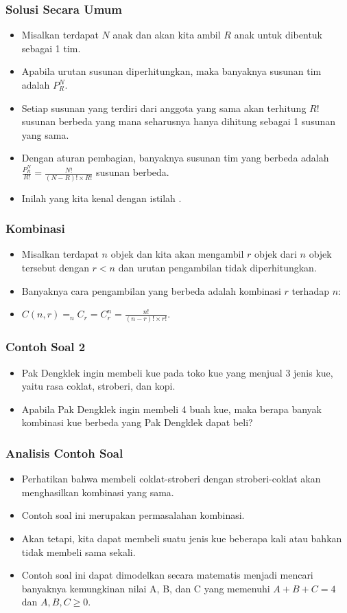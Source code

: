 \begin{frame}
\frametitle{Solusi Secara Umum}
\begin{itemize}
  \item Misalkan terdapat $N$ anak dan akan kita ambil $R$ anak untuk dibentuk sebagai 1 tim.
  \item Apabila urutan susunan diperhitungkan, maka banyaknya susunan tim adalah $P^{N}_{R}$.
  \item Setiap susunan yang terdiri dari anggota yang sama akan terhitung $R!$ susunan berbeda yang mana seharusnya hanya dihitung sebagai 1 susunan yang sama.
  \item Dengan aturan pembagian, banyaknya susunan tim yang berbeda adalah $\frac{P^{N}_{R}}{R!} = \frac{N!}{(N-R)! \times R!}$ susunan berbeda.
  \item Inilah yang kita kenal dengan istilah .
\end{itemize}
\end{frame}

\begin{frame}
\frametitle{Kombinasi}
\begin{itemize}
  \item Misalkan terdapat $n$ objek dan kita akan mengambil $r$ objek dari $n$ objek tersebut dengan $r<n$ dan urutan pengambilan tidak diperhitungkan.
  \item Banyaknya cara pengambilan yang berbeda adalah kombinasi $r$ terhadap $n$:
  \item $C(n,r) = _{n}C_{r} = C^{n}_{r} = \frac{n!}{(n-r)! \times r!}$.
\end{itemize}
\end{frame}

\begin{frame}
\frametitle{Contoh Soal 2}
\begin{itemize}
  \item Pak Dengklek ingin membeli kue pada toko kue yang menjual 3 jenis kue, yaitu rasa coklat, stroberi, dan kopi.
  \item Apabila Pak Dengklek ingin membeli 4 buah kue, maka berapa banyak kombinasi kue berbeda yang Pak Dengklek dapat beli?
\end{itemize}
\end{frame}

\begin{frame}
\frametitle{Analisis Contoh Soal}
\begin{itemize}
  \item Perhatikan bahwa membeli coklat-stroberi dengan stroberi-coklat akan menghasilkan kombinasi yang sama.
  \item Contoh soal ini merupakan permasalahan kombinasi.
  \item Akan tetapi, kita dapat membeli suatu jenis kue beberapa kali atau bahkan tidak membeli sama sekali.
  \item Contoh soal ini dapat dimodelkan secara matematis menjadi mencari banyaknya kemungkinan nilai A, B, dan C yang memenuhi $A + B + C = 4$ dan $A,B,C \geq 0$.
\end{itemize}
\end{frame}

